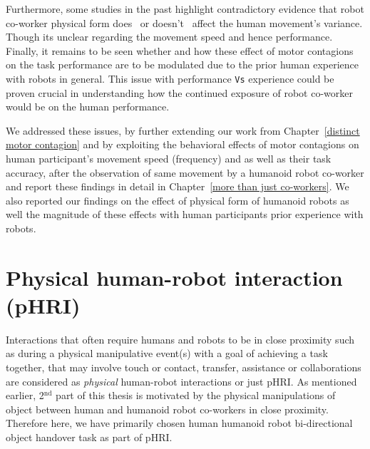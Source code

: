 Furthermore, some studies in the past highlight contradictory evidence that robot co-worker physical form does~\cite{Chaminade:JPP:2009} or doesn't~\cite{Kupferberg:PlosOne:2012} affect the human movement's variance. Though its unclear regarding the movement speed and hence performance. Finally, it remains to be seen whether and how these effect of motor contagions on the task performance are to be modulated due to the prior human experience with robots in general. This issue with performance \texttt{Vs} experience could be proven crucial in understanding how the continued exposure of robot co-worker would be on the human performance.

We addressed these issues, by further extending our work from Chapter~\ref{distinct motor contagion} and by exploiting the behavioral effects of motor contagions on human participant's movement speed (frequency) and as well as their task accuracy, after the observation of same movement by a humanoid robot co-worker and report these findings in detail in Chapter~\ref{more than just co-workers}. We also reported our findings on the effect of physical form of humanoid robots as well the magnitude of these effects with human participants prior experience with robots.




\section{Physical human-robot interaction (pHRI)}


Interactions that often require humans and robots to be in close proximity such as during a physical manipulative event(s) with a goal of achieving a task together, that may involve touch or contact, transfer, assistance or collaborations are considered as \textit{physical} human-robot interactions or just pHRI. As mentioned earlier, 2$^\text{nd}$ part of this thesis is motivated by the physical manipulations of object between human and humanoid robot co-workers in close proximity. Therefore here, we have primarily chosen human humanoid robot bi-directional object handover task as part of pHRI.  

